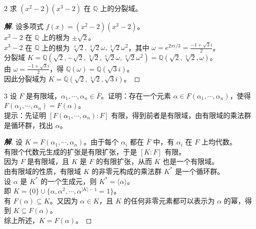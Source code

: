 \documentclass[12pt, a4paper]{article}
\newenvironment{solution}{
    \begin{proof}[\textbf{解}]
}{
    \end{proof}
}
\begin{document}
\begin{problem}{2}
    求 $(x^2 - 2)(x^3 - 2)$ 在 $\mathbb{Q}$ 上的分裂域。
\end{problem}
\begin{solution}
    设多项式 $f(x) = (x^2 - 2)(x^3 - 2)$。\\
    $x^2 - 2$ 在 $\mathbb{Q}$ 上的根为 $\pm \sqrt{2}$。\\
    $x^3 - 2$ 在 $\mathbb{Q}$ 上的根为 $\sqrt[3]{2}, \sqrt[3]{2}\omega, \sqrt[3]{2}\omega^2$，其中 $\omega = e^{2\pi i/3} = \frac{-1 + \sqrt{3}i}{2}$。\\
    分裂域 $K = \mathbb{Q}(\sqrt{2}, -\sqrt{2}, \sqrt[3]{2}, \sqrt[3]{2}\omega, \sqrt[3]{2}\omega^2) = \mathbb{Q}(\sqrt{2}, \sqrt[3]{2}, \omega)$。\\
    由 $\omega = \frac{-1 + \sqrt{3}i}{2}$，得 $\mathbb{Q}(\omega) = \mathbb{Q}(\sqrt{3}i)$。\\
    因此分裂域为 $K = \mathbb{Q}(\sqrt{2}, \sqrt[3]{2}, \sqrt{3}i)$。
\end{solution}


\begin{problem}{3}
    设 $F$ 是有限域，$\alpha_1, \cdots, \alpha_n \in \bar{F}$。证明：存在一个元素 $\alpha \in F(\alpha_1, \cdots, \alpha_n)$，使得 $F(\alpha_1, \cdots, \alpha_n) = F(\alpha)$。\\
    提示：先证明 $[F(\alpha_1, \cdots, \alpha_n) : F]$ 有限，得到前者是有限域，由有限域的乘法群是循环群，找出 $\alpha$。
\end{problem}
\begin{solution}
    设 $K = F(\alpha_1, \cdots, \alpha_n)$。由于每个 $\alpha_i$ 都在 $\bar{F}$ 中，有 $\alpha_i$ 在 $F$ 上均代数。\\
    有限个代数元生成的扩张是有限扩张，于是 $[K:F]$ 有限。\\
    因为 $F$ 是有限域，且 $K$ 是 $F$ 的有限扩张，从而 $K$ 也是一个有限域。\\
    由有限域的性质，有限域 $K$ 的非零元构成的乘法群 $K^*$ 是一个循环群。\\
    设 $\alpha$ 是 $K^*$ 的一个生成元，则 $K^* = \langle \alpha \rangle$。\\
    即 $K = \{0\} \cup \{\alpha, \alpha^2, \cdots, \alpha^{|K|-1}=1\}$。\\
    有 $F(\alpha) \subseteq K$。又因为 $\alpha \in K$，且 $K$ 的任何非零元素都可以表示为 $\alpha$ 的幂，得到 $K \subseteq F(\alpha)$。\\
    综上所述，$K = F(\alpha)$。
\end{solution}
    
\end{document}
